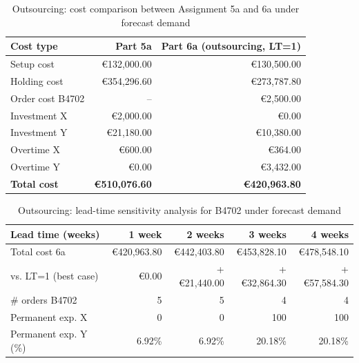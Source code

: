 \documentclass[a4paper,faculty=eb,language=en,doctype=article,sftitles=false]{ugent-doc}
\begin{document}
\begin{table}[H]
\centering
\small
\begin{tabular}{lrr}
\toprule
\textbf{Cost type} & \textbf{Part 5a} & \textbf{Part 6a (outsourcing, LT=1)} \\
\midrule
Setup cost        & €132{,}000.00 & €130{,}500.00 \\
Holding cost      & €354{,}296.60 & €273{,}787.80 \\
Order cost B4702  & --            & €2{,}500.00 \\
Investment X      & €2{,}000.00   & €0.00 \\
Investment Y      & €21{,}180.00  & €10{,}380.00 \\
Overtime X        & €600.00       & €364.00 \\
Overtime Y        & €0.00         & €3{,}432.00 \\
\midrule
\textbf{Total cost} & \textbf{€510{,}076.60} & \textbf{€420{,}963.80} \\
\bottomrule
\end{tabular}
\caption{Outsourcing: cost comparison between Assignment 5a and 6a under forecast demand}
\end{table}

\begin{table}[H]
\centering
\small
\begin{tabular}{lrrrr}
\toprule
\textbf{Lead time (weeks)} & \textbf{1 week} & \textbf{2 weeks} & \textbf{3 weeks} & \textbf{4 weeks} \\
\midrule
Total cost 6a & €420{,}963.80 & €442{,}403.80 & €453{,}828.10 & €478{,}548.10 \\
vs. LT=1 (best case) & €0.00 & +€21{,}440.00 & +€32{,}864.30 & +€57{,}584.30 \\
\# orders B4702 & 5 & 5 & 4 & 4 \\
Permanent exp. X & 0 & 0 & 100 & 100 \\
Permanent exp. Y (\%) & 6.92\% & 6.92\% & 20.18\% & 20.18\% \\
\bottomrule
\end{tabular}
\caption{Outsourcing: lead-time sensitivity analysis for B4702 under forecast demand}
\end{table}
\end{document}

